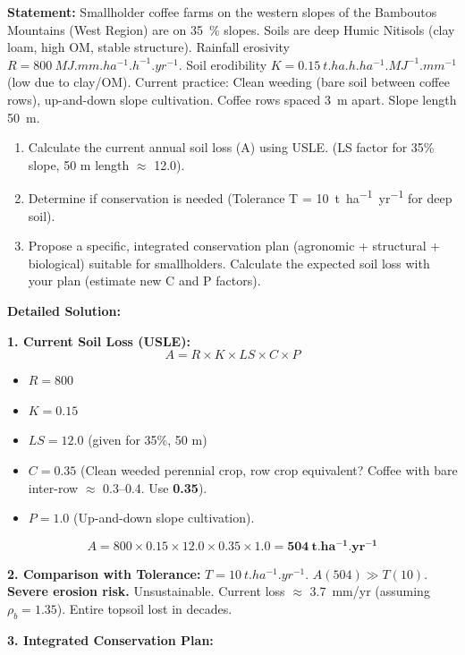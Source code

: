 \documentclass[11pt]{article}
\begin{document}
\begin{exoresolu}
\textbf{Statement:} Smallholder coffee farms on the western slopes of the Bamboutos Mountains (West Region) are on \SI{35}{\%} slopes. Soils are deep Humic Nitisols (clay loam, high OM, stable structure). Rainfall erosivity $R = \SI{800}{MJ.mm.ha^{-1}.h^{-1}.yr^{-1}}$. Soil erodibility $K = \SI{0.15}{t.ha.h.ha^{-1}.MJ^{-1}.mm^{-1}}$ (low due to clay/OM). Current practice: Clean weeding (bare soil between coffee rows), up-and-down slope cultivation. Coffee rows spaced \SI{3}{m} apart. Slope length \SI{50}{m}.
\begin{enumerate}
\item Calculate the current annual soil loss (A) using USLE. (LS factor for 35\% slope, 50 m length $\approx$ 12.0).
\item Determine if conservation is needed (Tolerance T = \SI{10}{t.ha^{-1}.yr^{-1}} for deep soil).
\item Propose a specific, integrated conservation plan (agronomic + structural + biological) suitable for smallholders. Calculate the expected soil loss with your plan (estimate new C and P factors).
\end{enumerate}

\tcblower
\textbf{Detailed Solution:}

\noindent\textbf{1. Current Soil Loss (USLE):}
\[
A = R \times K \times LS \times C \times P
\]
\begin{itemize}
\item $R = 800$
\item $K = 0.15$
\item $LS = 12.0$ (given for 35\%, 50 m)
\item $C = 0.35$ (Clean weeded perennial crop, row crop equivalent? Coffee with bare inter-row $\approx$ 0.3--0.4. Use \textbf{0.35}).
\item $P = 1.0$ (Up-and-down slope cultivation).
\end{itemize}
\[
A = 800 \times 0.15 \times 12.0 \times 0.35 \times 1.0 = \mathbf{504\ t.ha^{-1}.yr^{-1}}
\]

\noindent\textbf{2. Comparison with Tolerance:}
$T = \SI{10}{t.ha^{-1}.yr^{-1}}$.
$A (504) \gg T (10)$. \textbf{Severe erosion risk.} Unsustainable. Current loss $\approx$ \SI{3.7}{mm/yr} (assuming $\rho_b = 1.35$). Entire topsoil lost in decades.

\noindent\textbf{3. Integrated Conservation Plan:}


\end{exoresolu}
\end{document}
